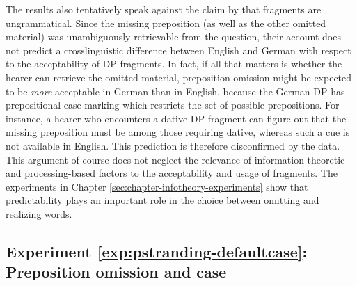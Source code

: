 The results also tentatively speak against the claim by \citet{bergen.goodman2015} that fragments are ungrammatical. Since the missing preposition (as well as the other omitted material) was unambiguously retrievable from the question, their account does not predict a crosslinguistic difference between English and German with respect to the acceptability of DP fragments. In fact, if all that matters is whether the hearer can retrieve the omitted material, preposition omission might be expected to be \textit{more} acceptable in German than in English, because the German DP has prepositional case marking which restricts the set of possible prepositions. For instance, a hearer who encounters a dative DP fragment can figure out that the missing preposition must be among those requiring dative, whereas such a cue is not available in English. This prediction is therefore disconfirmed by the data. This argument of course does not neglect the relevance of information-theoretic and processing-based factors to the acceptability and usage of fragments. The experiments in Chapter \ref{sec:chapter-infotheory-experiments} show that predictability plays an important role in the choice between omitting and realizing words.

\label{exp:pstranding-defaultcase}
\subsection{Experiment \ref{exp:pstranding-defaultcase}: Preposition omission and case}
\label{sec:pstranding-defaultcase}
